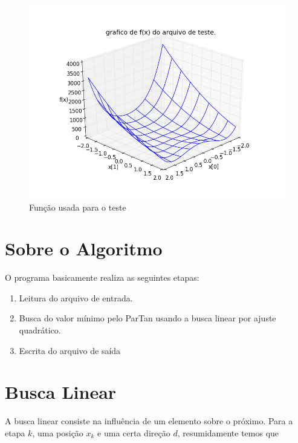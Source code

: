 \documentclass[12pt]{article}
\begin{document}
\begin{figure}[!h]
\centering
\includegraphics[width=14cm]{funcao_teste.png}
\caption{Função usada para o teste}
\label{funcao_teste}
\end{figure}




\section{Sobre o Algoritmo}
\mbox{}

O programa basicamente realiza as seguintes etapas:

\begin{enumerate}
	\item Leitura do arquivo de entrada.
	\item Busca do valor mínimo pelo ParTan usando a busca linear por ajuste quadrático.
	\item Escrita do arquivo de saída
\end{enumerate}


\section{Busca Linear}
\mbox{}

A busca linear consiste na influência de um elemento sobre o próximo. Para a etapa $k$, uma posição $x_{k}$ e uma certa direção $d$, resumidamente temos que
\end{document}
